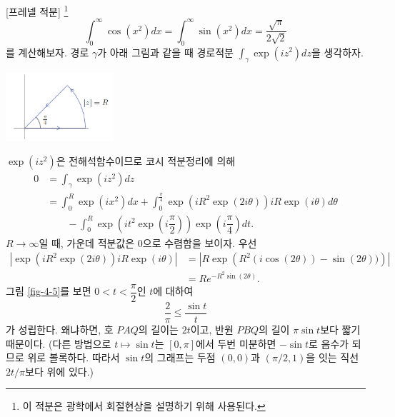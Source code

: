 \begin{saltexample}[label=example-4-20]{[프레넬 적분]}{} \footnote{
이 적분은 광학에서 회절현상을 설명하기 위해 사용된다.
}
\[
\int_0^\infty \cos(x^2) dx =  \int_0^\infty \sin(x^2) dx 
= \dfrac{\sqrt{\pi}}{2\sqrt{2}}
\]
를 계산해보자.
경로 $\gamma$가 아래 그림과 같을 때
경로적분 $\int_\gamma \exp(iz^2) dz$을 생각하자.

\begin{center}
\includegraphics[width=0.3\textwidth]{./SaltChapter/fig-4-0-13}
\end{center}

$\exp(iz^2)$은 전해석함수이므로
코시 적분정리에 의해
\begin{align*}
0 &= \int_\gamma \exp(iz^2) dz \\
& = \int_0^R \exp(ix^2)dx 
+ \int_0^{\frac\pi4} \exp(iR^2\exp(2i\theta))iR\exp(i\theta)d\theta \\
&\quad\quad 
- \int_0^R \exp\left( it^2\exp\left(i\dfrac\pi2\right)\right) 
\exp\left( i\dfrac\pi4\right)dt.
\end{align*}
$R\to\infty$일 때, 가운데 적분값은 $0$으로 수렴함을 보이자.
우선 
\begin{align*}
\left|  \exp(iR^2\exp(2i\theta))iR\exp(i\theta)  \right|
&= \left| R\exp\left(R^2(i\cos(2\theta)) - \sin(2\theta))\right) \right| \\
&= Re^{-R^2\sin(2\theta)}.
\end{align*}
그림 \ref{fig-4-5}를 보면 $0<t<\dfrac\pi2$인 $t$에 대하여
\[
\dfrac2\pi \le \dfrac{\sin t}t
\]
가 성립한다. 왜냐하면, 호 $PAQ$의 길이는 $2t$이고,
반원 $PBQ$의 길이 $\pi\sin t$보다 짧기 때문이다.
(다른 방법으로 $t\mapsto \sin t$는 $[0,\pi]$에서 
두번 미분하면 $-\sin t$로 음수가 되므로 위로 볼록하다.
따라서 $\sin t$의 그래프는 두점 $(0,0)$과 $(\pi/2,1)$을 잇는 직선 $2t/\pi$보다 위에 있다.)



\end{saltexample}
